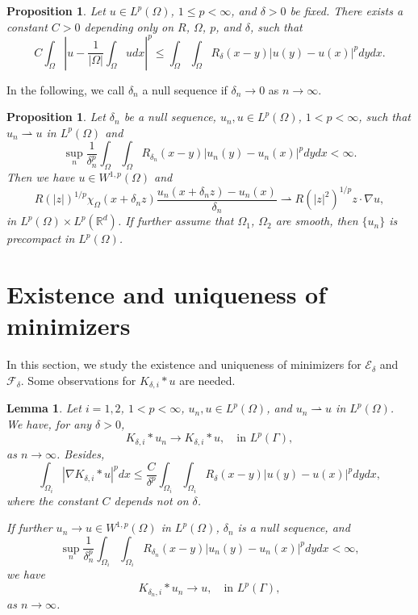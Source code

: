 \documentclass{article}
\newcommand{\R}{\mathbb{R}}
\newtheorem{proposition}[theorem]{Proposition}
\newtheorem{lemma}[theorem]{Lemma}
\theoremstyle{definition}
\begin{document}
\begin{proposition}\label{pr:2.3}
Let $u\in L^p(\Omega)$, $1\leq p<\infty$, and $\delta>0$ be fixed. There exists a constant $C>0$ depending only on $R$, $\Omega$, $p$, and $\delta$, such that
\begin{equation*}
  C\int_\Omega\left|u-\frac{1}{|\Omega|}\int_\Omega udx\right|^p
  \leq \int_\Omega\int_\Omega R_\delta(x-y)|u(y)-u(x)|^pdydx.
\end{equation*}
\end{proposition}
In the following, we call $\delta_n$ a null sequence if $\delta_n\rightarrow 0$ as $n\rightarrow \infty$.
\begin{proposition}\label{pr:2.4}
Let $\delta_n$ be a null sequence, $u_n, u\in L^p(\Omega)$, $1< p<\infty$, such that $u_n\rightharpoonup u$ in $L^p(\Omega)$ and
\[
\sup_{n}\frac{1}{\delta^p_n}\int_\Omega\int_\Omega R_{\delta_n}(x-y)|u_n(y)-u_n(x)|^pdydx<\infty.
\]
Then we have $u\in W^{1,p}(\Omega)$ and
\[
R(|z|)^{1/p}\chi_{\Omega}\left(x+\delta_n z\right)\frac{u_n(x+\delta_n z)-u_n(x)}{\delta_n}
\rightharpoonup
R(|z|^2)^{1/p} z\cdot\nabla u,
\]
in $L^p(\Omega)\times L^p(\R^d)$.
If further assume that $\Omega_1$, $\Omega_2$ are smooth, then $\{u_n\}$ is precompact in $L^p(\Omega)$.

\end{proposition}


\section{Existence and uniqueness of minimizers}
In this section, we study the existence and uniqueness of minimizers for $\mathcal{E}_\delta$ and $\mathcal{F}_\delta$.
Some observations for $K_{\delta,i}\ast u$ are needed.
\begin{lemma}\label{le:Ku}
  Let $i=1,2$, $1< p<\infty$, $u_n, u\in L^p(\Omega)$, and $u_n\rightharpoonup u$ in $L^p(\Omega)$.
  We have, for any $\delta>0$,
  \begin{equation}\label{eq:Ku:3}
    K_{\delta,i}\ast u_n\rightarrow  K_{\delta,i}\ast u,\quad \mbox{in } L^p(\Gamma),
  \end{equation}
  as $n\rightarrow\infty$.
  Besides,
  \begin{equation}\label{eq:Ku:4}
    \int_{\Omega_i} |\nabla K_{\delta,i}\ast u|^pdx
    \leq
    \frac{C}{\delta^p}\int_{\Omega_i}\int_{\Omega_i}R_\delta(x-y)|u(y)-u(x)|^pdydx,
  \end{equation}
  where the constant $C$ depends not on $\delta$.

  If further $u_n\rightarrow u\in W^{1,p}(\Omega)$ in $L^p(\Omega)$, $\delta_n$ is a null sequence, and
  \[
  \sup_{n}\frac{1}{\delta_n^p}\int_{\Omega_i}\int_{\Omega_i}R_{\delta_n}(x-y)|u_n(y)-u_n(x)|^pdydx<\infty,
  \]
  we have
  \begin{equation}\label{eq:Ku:5}
    K_{\delta_n,i}\ast u_n\rightarrow u,\quad \mbox{in } L^p(\Gamma),
  \end{equation}
  as $n\rightarrow\infty$.
  \end{lemma}
\end{document}
